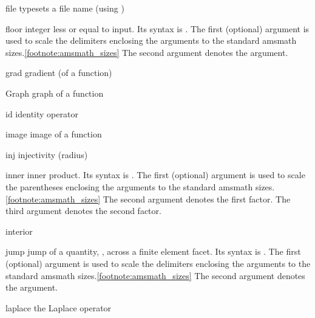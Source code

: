 \documentclass[english,a4paper,DIV=12,parskip=full,oneside]{scrartcl}
\begin{document}
\begin{commandlist}
        \item[file] typesets a file name (using )
            \par{}
        \item[floor] integer less or equal to input.
            Its syntax is .
            The first (optional) argument is used to scale the delimiters enclosing the arguments to the standard amsmath sizes.\cref{footnote:amsmath_sizes}
            The second argument denotes the argument.
            \par{}
            \par{}
        \item[grad] gradient (of a function)  %
        \item[Graph] graph of a function \mathCodeExample{\Graph}
        \item[id] identity operator \mathCodeExample{\id}
        \item[image] image of a function \mathCodeExample{\image}
        \item[inj] injectivity (radius) \mathCodeExample{\inj}
        \item[inner] inner product.
            Its syntax is .
            The first (optional) argument is used to scale the parentheses enclosing the arguments to the standard amsmath sizes.\cref{footnote:amsmath_sizes}
            The second argument denotes the first factor.
            The third argument denotes the second factor.
            \par{}
            \par{}
        \item[interior] \mathCodeExample{\interior}
        \item[jump] jump of a quantity, \eg, across a finite element facet.
            Its syntax is .
            The first (optional) argument is used to scale the delimiters enclosing the arguments to the standard amsmath sizes.\cref{footnote:amsmath_sizes}
            The second argument denotes the argument.
            \par{}
            \par{}
        \item[laplace] the Laplace operator  %

\end{commandlist}
\end{document}
